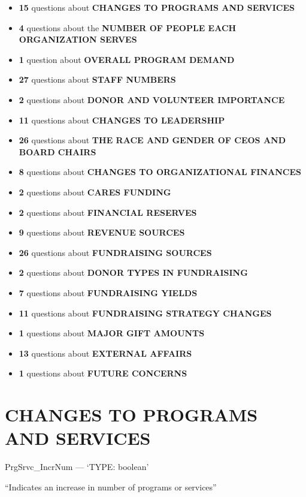 \documentclass[
  letterpaper,
]{scrbook}
\providecommand{\tightlist}{%
  \setlength{\itemsep}{0pt}\setlength{\parskip}{0pt}}\usepackage{longtable,booktabs,array}
\begin{document}
\begin{itemize}
\tightlist
\item
  \textbf{15} questions about \textbf{CHANGES TO PROGRAMS AND SERVICES}
\item
  \textbf{4} questions about the \textbf{NUMBER OF PEOPLE EACH
  ORGANIZATION SERVES}
\item
  \textbf{1} question about \textbf{OVERALL PROGRAM DEMAND}
\item
  \textbf{27} questions about \textbf{STAFF NUMBERS}
\item
  \textbf{2} questions about \textbf{DONOR AND VOLUNTEER IMPORTANCE}
\item
  \textbf{11} questions about \textbf{CHANGES TO LEADERSHIP}
\item
  \textbf{26} questions about \textbf{THE RACE AND GENDER OF CEOS AND
  BOARD CHAIRS}
\item
  \textbf{8} questions about \textbf{CHANGES TO ORGANIZATIONAL FINANCES}
\item
  \textbf{2} questions about \textbf{CARES FUNDING}
\item
  \textbf{2} questions about \textbf{FINANCIAL RESERVES}
\item
  \textbf{9} questions about \textbf{REVENUE SOURCES}
\item
  \textbf{26} questions about \textbf{FUNDRAISING SOURCES}
\item
  \textbf{2} questions about \textbf{DONOR TYPES IN FUNDRAISING}
\item
  \textbf{7} questions about \textbf{FUNDRAISING YIELDS}
\item
  \textbf{11} questions about \textbf{FUNDRAISING STRATEGY CHANGES}
\item
  \textbf{1} questions about \textbf{MAJOR GIFT AMOUNTS}
\item
  \textbf{13} questions about \textbf{EXTERNAL AFFAIRS}\\
\item
  \textbf{1} questions about \textbf{FUTURE CONCERNS}
\end{itemize}

\chapter{CHANGES TO PROGRAMS AND
SERVICES}\label{changes-to-programs-and-services}

PrgSrvc\_IncrNum --- {`TYPE: boolean'}

``Indicates an increase in number of programs or services''
\end{document}

